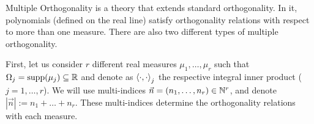 \documentclass[portrait,final,a0paper,fontscale=0.38]{baposter}
\begin{document}
\begin{poster}



  {

Multiple Orthogonality is a theory that extends standard orthogonality. In it, polynomials (defined on the real line) satisfy orthogonality relations with respect to more than one measure. There are also two different types of multiple orthogonality.

First, let us consider $r$ different real measures $\mu_1,\dots,\mu_r$ such that $\Omega_j=\mathrm{supp}(\mu_j)\subseteq\mathbb{R}$ and denote as $\left\langle \cdot , \cdot \right\rangle_j$ the respective integral inner product ($j=1,\dots,r$). We will use multi-indices $\vec n = (n_1, \dots,n_r)\in \mathbb{N}^r$, and denote $|\vec n| := n_1 + \dots + n_r$. These multi-indices determine the orthogonality relations with each measure.

}
\end{poster}
\end{document}
